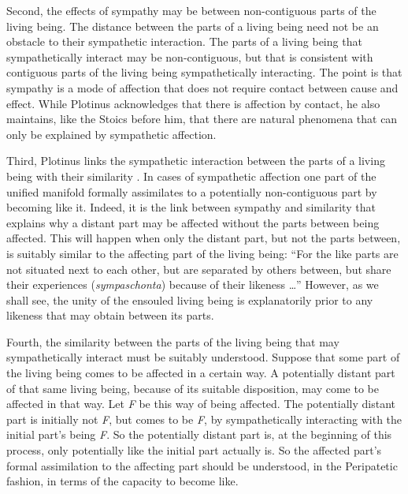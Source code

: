 Second, the effects of sympathy may be between non-contiguous parts of the living being. The distance between the parts of a living being need not be an obstacle to their sympathetic interaction. The parts of a living being that sympathetically interact may be non-contiguous, but that is consistent with contiguous parts of the living being sympathetically interacting. The point is that sympathy is a mode of affection that does not require contact between cause and effect. While Plotinus acknowledges that there is affection by contact, he also maintains, like the Stoics before him, that there are natural phenomena that can only be explained by sympathetic affection.

Third, Plotinus links the sympathetic interaction between the parts of a living being with their similarity \citep{Emilsson:1988uq,Emilsson:2015wf}. In cases of sympathetic affection one part of the unified manifold formally assimilates to a potentially non-contiguous part by becoming like it. Indeed, it is the link between sympathy and similarity that explains why a distant part may be affected without the parts between being affected. This will happen when only the distant part, but not the parts between, is suitably similar to the affecting part of the living being: ``For the like parts are not situated next to each other, but are separated by others between, but share their experiences (\emph{sympaschonta}) because of their likeness \ldots'' However, as we shall see, the unity of the ensouled living being is explanatorily prior to any likeness that may obtain between its parts.

Fourth, the similarity between the parts of the living being that may sympathetically interact must be suitably understood. Suppose that some part of the living being comes to be affected in a certain way. A potentially distant part of that same living being, because of its suitable disposition, may come to be affected in that way. Let \emph{F} be this way of being affected. The potentially distant part is initially not \emph{F}, but comes to be \emph{F}, by sympathetically interacting with the initial part's being \emph{F}. So the potentially distant part is, at the beginning of this process, only potentially like the initial part actually is. So the affected part's formal assimilation to the affecting part should be understood, in the Peripatetic fashion, in terms of the capacity to become like.

